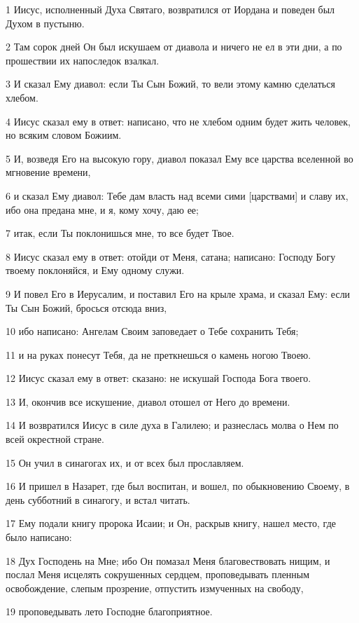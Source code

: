 \par 1 Иисус, исполненный Духа Святаго, возвратился от Иордана и поведен был Духом в пустыню.
\par 2 Там сорок дней Он был искушаем от диавола и ничего не ел в эти дни, а по прошествии их напоследок взалкал.
\par 3 И сказал Ему диавол: если Ты Сын Божий, то вели этому камню сделаться хлебом.
\par 4 Иисус сказал ему в ответ: написано, что не хлебом одним будет жить человек, но всяким словом Божиим.
\par 5 И, возведя Его на высокую гору, диавол показал Ему все царства вселенной во мгновение времени,
\par 6 и сказал Ему диавол: Тебе дам власть над всеми сими [царствами] и славу их, ибо она предана мне, и я, кому хочу, даю ее;
\par 7 итак, если Ты поклонишься мне, то все будет Твое.
\par 8 Иисус сказал ему в ответ: отойди от Меня, сатана; написано: Господу Богу твоему поклоняйся, и Ему одному служи.
\par 9 И повел Его в Иерусалим, и поставил Его на крыле храма, и сказал Ему: если Ты Сын Божий, бросься отсюда вниз,
\par 10 ибо написано: Ангелам Своим заповедает о Тебе сохранить Тебя;
\par 11 и на руках понесут Тебя, да не преткнешься о камень ногою Твоею.
\par 12 Иисус сказал ему в ответ: сказано: не искушай Господа Бога твоего.
\par 13 И, окончив все искушение, диавол отошел от Него до времени.
\par 14 И возвратился Иисус в силе духа в Галилею; и разнеслась молва о Нем по всей окрестной стране.
\par 15 Он учил в синагогах их, и от всех был прославляем.
\par 16 И пришел в Назарет, где был воспитан, и вошел, по обыкновению Своему, в день субботний в синагогу, и встал читать.
\par 17 Ему подали книгу пророка Исаии; и Он, раскрыв книгу, нашел место, где было написано:
\par 18 Дух Господень на Мне; ибо Он помазал Меня благовествовать нищим, и послал Меня исцелять сокрушенных сердцем, проповедывать пленным освобождение, слепым прозрение, отпустить измученных на свободу,
\par 19 проповедывать лето Господне благоприятное.
